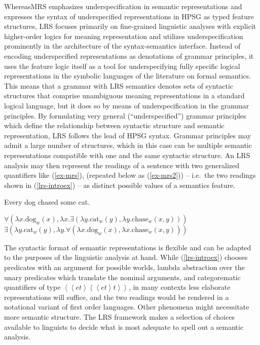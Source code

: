 \documentclass[output=paper,biblatex,babelshorthands,newtxmath,draftmode,colorlinks,citecolor=brown]{langscibook}
\begin{document}
Whereas\indexlrsstart MRS emphasizes underspecification in semantic representations and expresses the syntax of underspecified representations in HPSG as typed feature structures, LRS focuses primarily on fine-grained linguistic analyses with explicit higher-order logics for meaning representation and utilizes underspecification prominently in the architecture of the syntax-semantics interface. Instead of encoding underspecified representations as denotations of grammar principles, it uses the feature logic itself as a tool for underspecifying fully specific logical representations in the symbolic languages of the literature on formal semantics. This means that a grammar with LRS semantics denotes sets of syntactic structures that comprise unambiguous meaning representations in a standard logical language, but it does so by means of underspecification in the grammar principles. By formulating very general (``underspecified'') grammar principles which define the relationship between syntactic structure and semantic representation, LRS follows the lead of HPSG syntax.
Grammar principles may admit a large number of structures, which in this case can be multiple semantic representations compatible with one and the same syntactic structure. An LRS analysis may then represent the readings of a sentence with two generalized quantifiers like (\ref{ex-mrs}),  (repeated below as (\ref{ex-mrs2})) -- i.e.\ the two readings shown in (\ref{lrs-introex}) -- as distinct possible values of a semantics feature. 


\ea
\label{ex-mrs2}
Every dog chased some cat.
\z

\eal
\label{lrs-introex}
\ex\label{lrs-introex1a}
  
  $\forall \left(\lambda x.\text{dog}_w(x),\lambda x.\exists \left(\lambda y.\text{cat}_w(y),\lambda y.\text{chase}_w(x,y)\right)\right)$ 
\ex\label{lrs-introex1b}
  $\exists \left(\lambda y.\text{cat}_w(y),\lambda y.\forall \left(\lambda x.\text{dog}_w(x),\lambda x.\text{chase}_w(x,y)\right)\right)$ 
\zl


The syntactic format of semantic representations is flexible and can be adapted to the purposes of the linguistic analysis at hand. While (\ref{lrs-introex}) chooses predicates with an argument for possible worlds, lambda abstraction over the unary predicates which translate the nominal arguments, and categorematic quantifiers of type ${\left<\left<et\right>\left<\left<et\right>t\right>\right>}$, in many contexts less elaborate representations will suffice, and the two readings would be rendered in a notational variant of first order languages. Other phenomena might necessitate more semantic structure. The LRS framework makes a selection of choices available to linguists to decide what is most adequate to spell out a semantic analysis.
\end{document}
